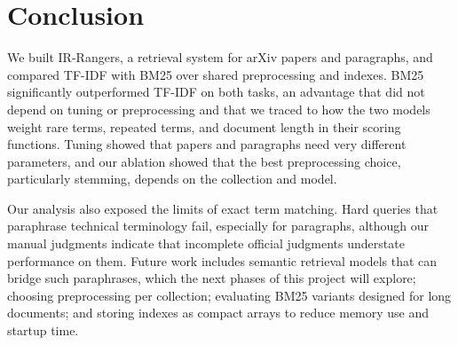 \documentclass[sigconf,nonacm]{acmart}
\begin{document}
\section{Conclusion}
We built IR-Rangers, a retrieval system for arXiv papers and paragraphs, and compared TF-IDF 
with BM25 over shared preprocessing and indexes. BM25 significantly outperformed TF-IDF on 
both tasks, an advantage that did not depend on tuning or preprocessing and that we traced 
to how the two models weight rare terms, repeated terms, and document length in their 
scoring functions. Tuning showed that papers and paragraphs need very different parameters, 
and our ablation showed that the best preprocessing choice, particularly stemming, depends on the 
collection and model.

Our analysis also exposed the limits of exact term matching. Hard queries that paraphrase technical 
terminology fail, especially for paragraphs, although our manual judgments indicate that incomplete official 
judgments understate performance on them. Future work includes semantic retrieval models that 
can bridge such paraphrases, which the next phases of this project will explore; choosing preprocessing 
per collection; evaluating BM25 variants designed for long documents; and storing indexes as compact 
arrays to reduce memory use and startup time.



\end{document}
